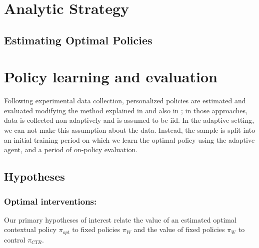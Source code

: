 \documentclass[letterpaper, 12pt, parskip=full,DIV=12]{scrartcl}
\begin{document}
\section{Analytic Strategy}
\subsection{Estimating Optimal Policies}






\section{Policy learning and evaluation}

Following experimental data collection, personalized policies are estimated and evaluated modifying the method explained in \cite{athey2017efficient} and also in \cite{zhou2018offline}; in those approaches, data is collected non-adaptively and is assumed to be iid. In the adaptive setting, we can not make this assumption about the data. Instead, the sample is split into an initial training period on which we learn the optimal policy using the adaptive agent, and a period of on-policy evaluation. 


\subsection{Hypotheses}
\subsubsection{Optimal interventions:}

Our primary hypotheses of interest relate the value of an estimated optimal contextual policy $\pi_{opt}$ to fixed policies $\pi_{W}$ and the value of fixed policies $\pi_{W}$ to control $\pi_{CTR}$.
\end{document}

